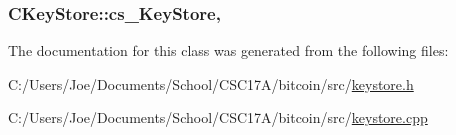 \subsubsection[{cs\+\_\+\+Key\+Store}]{ C\+Key\+Store\+::cs\+\_\+\+Key\+Store\hspace{0.3cm}{\ttfamily [mutable]}, {\ttfamily [protected]}}\label{class_c_key_store_a386524ff4a00959b81c195cb39fe307d}


The documentation for this class was generated from the following files\+:\begin{DoxyCompactItemize}
\item 
C\+:/\+Users/\+Joe/\+Documents/\+School/\+C\+S\+C17\+A/bitcoin/src/\hyperlink{keystore_8h}{keystore.\+h}\item 
C\+:/\+Users/\+Joe/\+Documents/\+School/\+C\+S\+C17\+A/bitcoin/src/\hyperlink{keystore_8cpp}{keystore.\+cpp}\end{DoxyCompactItemize}
